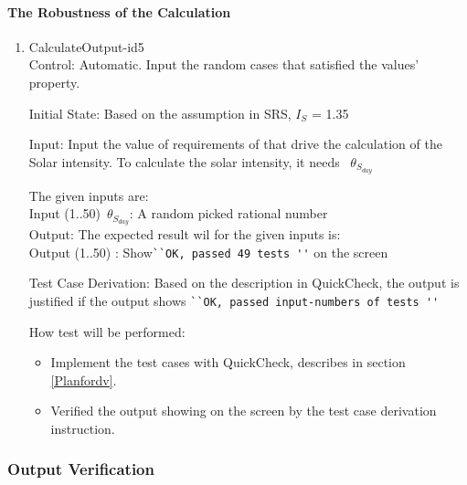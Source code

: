 \documentclass[12pt, titlepage]{article}
\begin{document}

\paragraph{The Robustness of the Calculation}

\begin{enumerate}
 

\item{CalculateOutput-id5\\}
Control: Automatic. Input the random cases that satisfied the values' property.

Initial State: Based on the assumption in SRS\cite{YS2019}, $I_{S}$ = 1.35

Input: Input the value of requirements of \progname that drive the calculation
of the Solar intensity. To calculate the solar intensity, it needs
~$\theta_{S_{day}}$

The given inputs are:\\ 
Input (1..50)~$\theta_{S_{day}}$: A random picked rational number\\

Output: The expected result wil for the given inputs is:\\ 
Output (1..50) : Show\verb|``OK, passed 49 tests ''| on the screen\\


Test Case Derivation: Based on the description in QuickCheck\cite{QuickCheck},
the output is justified if the output shows \verb|``OK, passed input-numbers of tests ''|


How test will be performed:
 \begin{itemize} 
\item Implement the test cases with QuickCheck\cite{QuickCheck}, describes in 
section \ref{Planfordv}.
\item Verified the output showing on the screen by the test case derivation
instruction.
\end{itemize} 
\end{enumerate}

\subsubsection{Output Verification}\label{STD_VO} 
\end{document}
